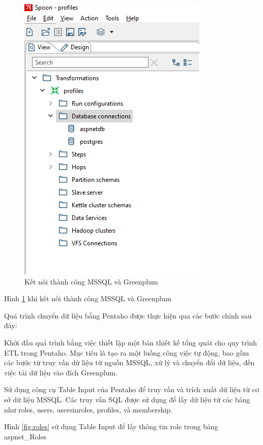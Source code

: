 \documentclass[14pt]{article}
\begin{document}
\begin{figure}
    \centering
    \includegraphics[width=0.8\linewidth]{images/ComMSGL.png}
    \caption{Kết nói thành công MSSQL và Greenplum}
    \label{fig:ComMSGL}
\end{figure}


Hình \ref{fig:ComMSGL} khi kết nối thành công MSSQL và Greenplum 


Quá trình chuyển dữ liệu bằng Pentaho được thực hiện qua các bước chính sau đây:

Khởi đầu quá trình bằng việc thiết lập một bản thiết kế tổng quát cho quy trình ETL trong Pentaho. Mục tiêu là tạo ra một luồng công việc tự động, bao gồm các bước từ truy vấn dữ liệu từ nguồn MSSQL, xử lý và chuyển đổi dữ liệu, đến việc tải dữ liệu vào đích Greenplum.

Sử dụng công cụ Table Input của Pentaho để truy vấn và trích xuất dữ liệu từ cơ sở dữ liệu MSSQL. Các truy vấn SQL được sử dụng để lấy dữ liệu từ các bảng như roles, users, usersinroles, profiles, và membership.

Hình \ref{fig:roles} sử dụng Table Input để lấy thông tin role trong bảng aspnet\_Roles
\end{document}
